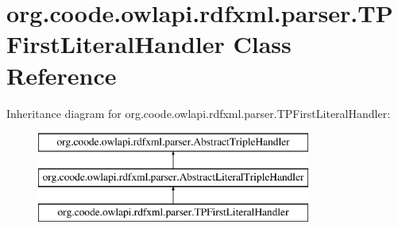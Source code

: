 \hypertarget{classorg_1_1coode_1_1owlapi_1_1rdfxml_1_1parser_1_1_t_p_first_literal_handler}{\section{org.\-coode.\-owlapi.\-rdfxml.\-parser.\-T\-P\-First\-Literal\-Handler Class Reference}
\label{classorg_1_1coode_1_1owlapi_1_1rdfxml_1_1parser_1_1_t_p_first_literal_handler}
}
Inheritance diagram for org.\-coode.\-owlapi.\-rdfxml.\-parser.\-T\-P\-First\-Literal\-Handler\-:\begin{figure}[H]
\begin{center}
\leavevmode
\includegraphics[height=3.000000cm]{classorg_1_1coode_1_1owlapi_1_1rdfxml_1_1parser_1_1_t_p_first_literal_handler}
\end{center}
\end{figure}
